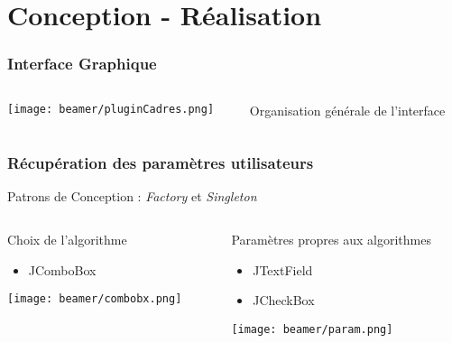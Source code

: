 \documentclass[11pt]{beamer}
\begin{document}
\section{Conception - Réalisation}
\begin{frame}
\frametitle{Interface Graphique}
	\begin{columns}
		\begin{column}{6cm}
			\texttt{[image: beamer/pluginCadres.png]}
		\end{column}
		\begin{column}{4cm}
			Organisation générale de l'interface
		\end{column}
	\end{columns}
\end{frame}
\begin{frame}
\frametitle{Récupération des paramètres utilisateurs}
	Patrons de Conception : \emph{Factory} et \emph{Singleton}
	\begin{columns}[t]
		\begin{column}{5cm}
			\begin{block}{Choix de l'algorithme}
				\begin{itemize}
					\item JComboBox
				\end{itemize}
			\end{block}
			\vspace*{2cm}
			\texttt{[image: beamer/combobx.png]}
		\end{column}
		\begin{column}{5cm}
			\begin{block}{Paramètres propres aux algorithmes}
				\begin{itemize}
					\item JTextField
					\item JCheckBox
				\end{itemize}
			\end{block}
			\texttt{[image: beamer/param.png]}
		\end{column}
	\end{columns}
\end{frame}
\end{document}

